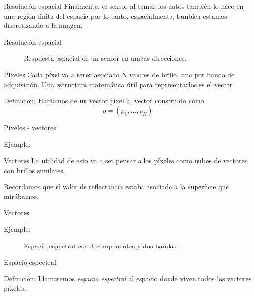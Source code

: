 \documentclass[handout,draft]{beamer}
\begin{document}
\begin{frame}{Resolución espacial}
  Finalmente, el sensor al tomar los datos también lo hace en una región finita del espacio por lo tanto, espacialmente, también estamos discretizando a la imagen.
\end{frame}

\begin{frame}{Resolución espacial}
  \begin{figure}
  \centering
  \caption{Respuesta espacial de un sensor en ambas direcciones.}
  \end{figure}
\end{frame}

\begin{frame}{Pixeles}
  Cada píxel va a tener asociado N valores de brillo, uno por banda de adquisición. Una estructura matemática útil para representarlos es el vector
  \begin{block}{Definición:}
    Hablamos de un vector píxel al vector construido como
    \begin{equation}
      p = (\rho_1, ... ,\rho_N)
    \end{equation}
  \end{block}
\end{frame}

\begin{frame}{Píxeles - vectores}
  \begin{exampleblock}{Ejemplo:}
    \begin{figure}
    \end{figure}
  \end{exampleblock}
\end{frame}

\begin{frame}{Vectores}
  La utilidad de esto va a ser pensar a los píxeles como nubes de vectores con brillos similares.

  Recordamos que el valor de reflectancia estaba asociado a la superficie que mirábamos.
\end{frame}

\begin{frame}{Vectores}
  \begin{exampleblock}{Ejemplo:}
    \begin{figure}
      \caption{Espacio espectral con 3 componentes y dos bandas.}
    \end{figure}
  \end{exampleblock}
\end{frame}

\begin{frame}{Espacio espectral}
  \begin{block}{Definición:}
    Llamaremos \emph{espacio espectral} al espacio donde viven todos los vectores píxeles.
  \end{block}
\end{frame}
\end{document}
